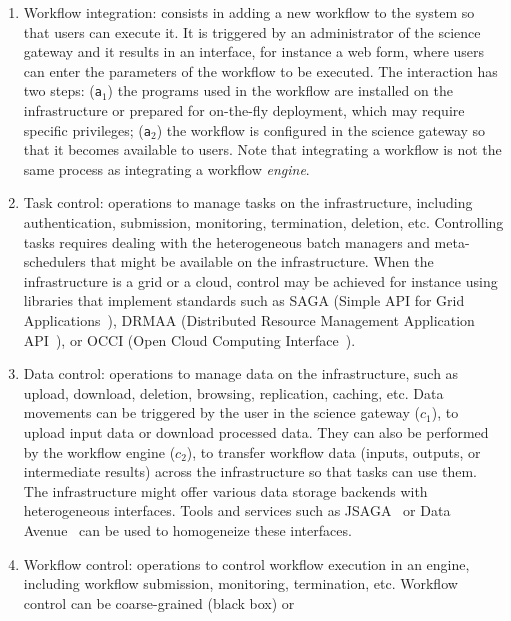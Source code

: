 \documentclass[preprint,3p,twocolumn]{elsarticle}
\begin{document}
\begin{enumerate}[leftmargin=0cm,itemindent=0.65cm,label=\texttt{(\alph*)}]

\item Workflow integration: consists in adding a new workflow to the
  system so that users can execute it. It is triggered by an
  administrator of the science gateway and it results in an interface,
  for instance a web form, where users can enter the parameters of the
  workflow to be executed. The interaction has two steps:
  (\texttt{a$_1$}) the programs used in the workflow are installed on
  the infrastructure or prepared for on-the-fly deployment, which
  may require specific privileges; (\texttt{a$_2$}) the
  workflow is configured in the science gateway so that it becomes
  available to users. Note that integrating a workflow is not the same
  process as integrating a workflow \emph{engine}.
\item Task control: operations to manage tasks on the infrastructure,
  including authentication, submission, monitoring, termination,
  deletion, etc. Controlling tasks requires dealing with the
  heterogeneous batch managers and meta-schedulers that might be
  available on the infrastructure. When the infrastructure is a grid
  or a cloud, control may be achieved for instance using libraries that
  implement standards such as SAGA (Simple API for Grid
  Applications~\cite{goodale2006saga}), DRMAA (Distributed Resource
  Management Application API~\cite{troger2012distributed}), or OCCI
  (Open Cloud Computing Interface~\cite{edmonds2012toward}).
\item Data control: operations to manage data on the infrastructure,
  such as upload, download, deletion, browsing, replication, caching,
  etc. Data movements can be triggered by the user in the science
  gateway (\texttt{$c_1$}), to upload input data or download processed
  data. They can also be performed by the workflow engine
  (\texttt{$c_2$}), to transfer workflow data (inputs, outputs, or
  intermediate results) across the infrastructure so that tasks can
  use them. The infrastructure might offer various data storage backends
  with heterogeneous interfaces. 
  Tools and services such as JSAGA~\cite{reynaud2010uniform} or Data Avenue~\cite{hajnal2014data}
  can be used to homogeneize these interfaces.
\item Workflow control: operations to control workflow execution in an
  engine, including workflow submission, monitoring, termination,
  etc. Workflow control can be coarse-grained (black box) or

\end{enumerate}
\end{document}
